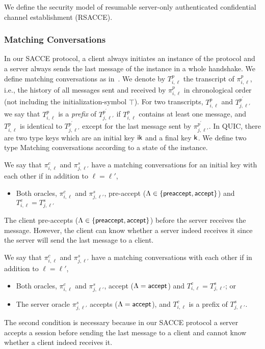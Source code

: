 We define the security model of resumable server-only
authenticated confidential channel establishment (RSACCE).

\subsubsection{Matching Conversations}
In our SACCE protocol, a client always initiates an
instance of the protocol and a server always sends the
last message of the instance in a whole handshake.
We define matching conversations as in~\cite{JKSS12:ACCE}.
We denote by $T^p_{i,\ell}$ the transcript of
$\pi^p_{i,\ell}$, i.e., the history of all messages sent
and received by $\pi^p_{i,\ell}$ in chronological order
(not including the initialization-symbol $\top$).
For two transcripts, $T^p_{i,\ell}$ and
$T^{p^{\prime}}_{j,\ell'}$ we say that $T^p_{i,\ell}$
is a \textit{prefix} of $T^{p^{\prime}}_{j,\ell'}$ if
$T^p_{i,\ell}$ contains at least one message, and
$T^p_{i,\ell}$ is identical to
$T^{p^{\prime}}_{j,\ell'}$ except for the last message sent
by $\pi^{p^{\prime}}_{j,\ell'}$.
In QUIC, there are two type keys which are an initial key $\mathsf{ik}$ and
a final key $\mathsf{k}$.
We define two type Matching conversations according to
a state of the instance.

\begin{definition}
 We say that $\pi^c_{i,\ell}$ and $\pi^s_{j,\ell'}$ have
 a matching conversations for an initial key with each other if
 in addition to $\ell=\ell'$,
 \begin{itemize}
  \item{Both oracles, $\pi^c_{i, \ell}$ and
  $\pi^s_{j,\ell'}$, pre-accept ($\Lambda \in \{\mathsf{preaccept}, \mathsf{accept} \}$) and
  $T^c_{i,\ell} = T^s_{j,\ell'}$}
 \end{itemize}
\end{definition}
\begin{remark}
 The client pre-accepts ($\Lambda \in \{\mathsf{preaccept}, \mathsf{accept} \}$) before the
 server receives the message. However, the client can know whether
 a server indeed receives it since the server will send the
 last message to a client.
\end{remark}
\begin{definition}
 We say that $\pi^c_{i,\ell}$ and $\pi^s_{j,\ell'}$ have
 a matching conversations with each other if in addition
 to $\ell=\ell'$,
 \begin{itemize}
  \item{Both oracles, $\pi^c_{i, \ell}$ and
  $\pi^s_{j,\ell'}$, accept ($\Lambda = \mathsf{accept}$) and
  $T^c_{i,\ell} = T^s_{j,\ell'}$; or}

  \item{The server oracle $\pi^s_{j, \ell'}$ accepts
  ($\Lambda = \mathsf{accept}$),
  and $T^c_{i,\ell}$ is a prefix of $T^s_{j,\ell'}$.}
 \end{itemize}
\end{definition}
\begin{remark}
 The second condition is necessary because in our SACCE
 protocol a server accepts a session before sending the
 last message to a client and cannot know whether a
 client indeed receives it.
\end{remark}

